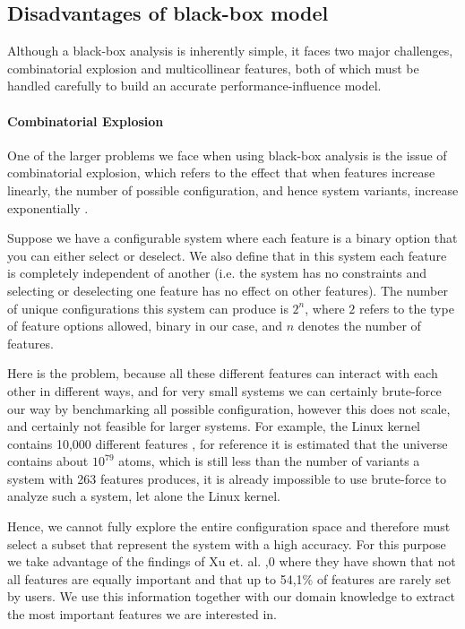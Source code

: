 \subsection{Disadvantages of black-box model}
Although a black-box analysis is inherently simple, it faces two major challenges, combinatorial explosion and multicollinear features, both of which
must be handled carefully to build an accurate performance-influence model.

\paragraph{Combinatorial Explosion}
One of the larger problems we face when using black-box analysis is the issue of combinatorial explosion, 
which refers to the effect that when features increase linearly, the number of possible configuration, and hence system variants,
increase exponentially \cite{Combinatorial-explosion}.

Suppose we have a configurable system where each feature is a binary option that you can either select or deselect. We also define 
that in this system each feature is completely independent of another (i.e. the system has no constraints and selecting or deselecting one feature
has no effect on other features). The number of unique configurations this system can produce is $2^n$, where $2$ refers to
the type of feature options allowed, binary in our case, and $n$ denotes the number of features. 

Here is the problem, because all these different features can interact with each other in different ways, and for very small systems
we can certainly brute-force our way by benchmarking all possible configuration, however this does not scale, and certainly not feasible for 
larger systems. For example, the Linux kernel contains 10,000 different features \cite{Linux-Kernel}, for reference it is estimated that the universe
contains about $10^{79}$ atoms, which is still less than the number of variants a system with 263 features produces, it is already impossible to use brute-force to analyze
such a system, let alone the Linux kernel.

Hence, we cannot fully explore the entire configuration space and therefore must select a subset that 
represent the system with a high accuracy. For this purpose we take advantage of the findings of Xu et. al. \cite{TooManyKnobs},0
where they have shown that not all features are equally important and that up to 54,1\% of features are rarely set by users. We use
this information together with our domain knowledge to extract the most important features we are interested in.

